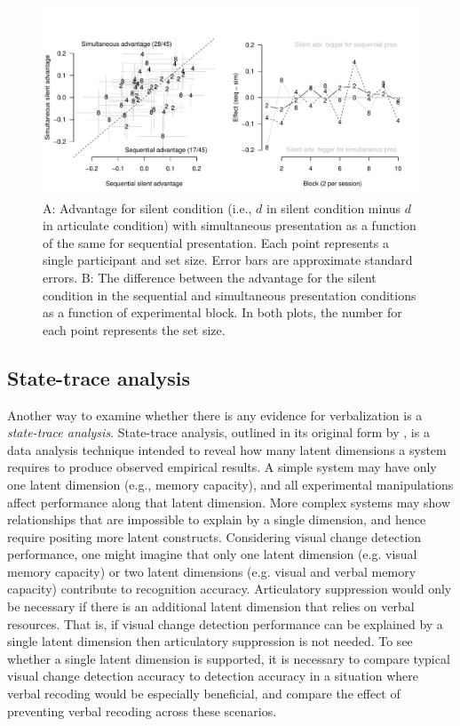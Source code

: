\begin{figure}[t]
 	\centering
	\includegraphics[width=\textwidth]{figures/effects}
	\caption{A: Advantage for silent condition (i.e., $d$ in silent condition minus $d$ in articulate condition) with simultaneous presentation as a function of the same for sequential presentation. Each point represents a single participant and set size. Error bars are approximate standard errors. B: The difference between the advantage for the silent condition in the sequential and simultaneous presentation conditions as a function of experimental block. In both plots, the number for each point represents the set size.}

	\label{fig:effects}
\end{figure}


\subsection{State-trace analysis}
Another way to examine whether there is any evidence for verbalization is a {\em state-trace analysis}. State-trace analysis, outlined in its original form by \citet{Bamber:1979}, is a data analysis technique intended to reveal how many latent dimensions a system requires to produce observed empirical results. A simple system may have only one latent dimension (e.g., memory capacity), and all experimental manipulations affect performance along that latent dimension. More complex systems may show relationships that are impossible to explain by a single dimension, and hence require positing more latent constructs. Considering visual change detection performance, one might imagine that only one latent dimension (e.g. visual memory capacity) or two latent dimensions (e.g. visual and verbal memory capacity) contribute to recognition accuracy. Articulatory suppression would only be necessary if there is an additional latent dimension that relies on verbal resources. That is, if visual change detection performance can be explained by a single latent dimension then articulatory suppression is not needed. To see whether a single latent dimension is supported, it is necessary to compare typical visual change detection accuracy to detection accuracy in a situation where verbal recoding would be especially beneficial, and compare the effect of preventing verbal recoding across these scenarios. 

